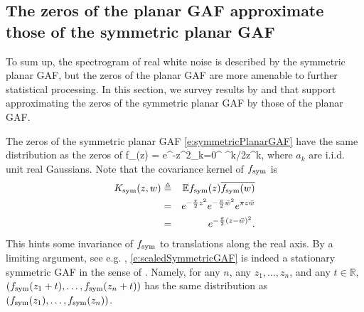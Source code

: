 \subsection{The zeros of the planar GAF approximate those of the symmetric
  planar GAF}
  \label{s:GAFapproxSYM}
  
To sum up, the spectrogram of real white noise is described by the symmetric
planar GAF, but the zeros of the planar GAF are more amenable to further
statistical processing. In this section, we survey results by \cite{Fel13} and
\cite{Pro96} that support approximating the zeros of the symmetric planar GAF by
those of the planar GAF.

The zeros of the symmetric planar GAF \eqref{e:symmetricPlanarGAF} have the same
distribution as the zeros of
\beq
f_{\sym}(z) = e^{-z^2}\sum_{k=0}^\infty
{}\pi^{k/2}z^k,
\label{e:scaledSymmetricGAF}
\eeq
where $a_k$ are i.i.d. unit real Gaussians. Note that the covariance kernel of $f_{\text{sym}}$ is
\begin{eqnarray*}
K_{\text{sym}}(z,w) &\triangleq& \mathbb{E} f_{\text{sym}}(z)\overline{f_{\text{sym}}(w)}\\
&=& e^{-\frac{\pi}{2}z^2} e^{-\frac{\pi}{2}\bar{w}^2} e^{\pi z\bar{w}}\\
&=& e^{-\frac{\pi}{2}(z-\bar{w})^2}.
\end{eqnarray*}
This hints some invariance of $f_{\text{sym}}$ to translations along the real axis. By a limiting argument, see e.g. \cite[Lemma
  2.3.3]{HKPV09}, \eqref{e:scaledSymmetricGAF} is indeed a stationary symmetric
GAF in the sense of \cite{Fel13}. Namely, for any $n$, any
$z_1,\dots,z_n$, and any $t\in\mathbb{R}$,
$\left(f_{\text{sym}}(z_1+t),\dots,f_{\text{sym}}(z_n+t)\right)$ has the same distribution as
$\left( f_{\text{sym}}(z_1),\dots,f_{\text{sym}}(z_n) \right)$.

